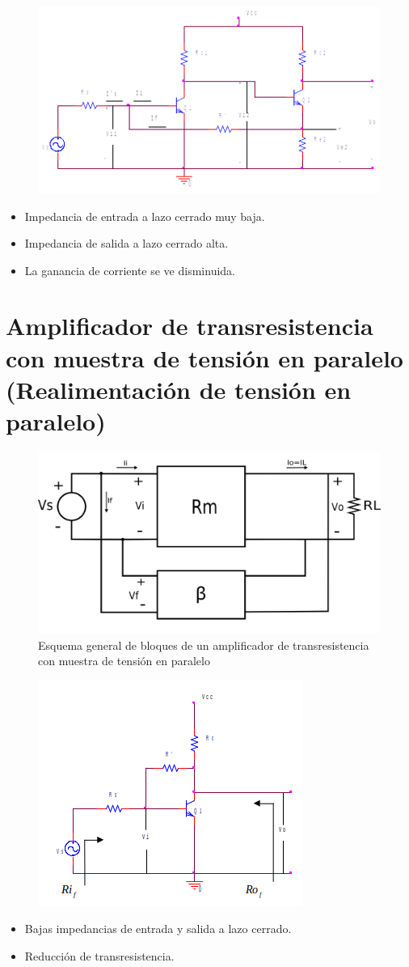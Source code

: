 \newpage

\begin{figure}[h]
	\includegraphics[width=0.8\linewidth]{./img/esq3.png}
	\centering
	\label{fig:esq_amp3}
\end{figure}

\begin{itemize}
	\item Impedancia de entrada a lazo cerrado muy baja.
	\item Impedancia de salida a lazo cerrado alta.
	\item La ganancia de corriente se ve disminuida.
\end{itemize}

\section{Amplificador de transresistencia con muestra de tensión en paralelo (Realimentación de tensión en paralelo)}

\begin{figure}[h]
	\includegraphics[width=0.8\linewidth]{./img/4.png}
	\centering
	\caption{Esquema general de bloques de un amplificador de transresistencia con muestra de tensión en paralelo}
	\label{fig:amp4}
\end{figure}
\newpage
\begin{figure}[h]
	\includegraphics[width=0.5\linewidth]{./img/esq4.png}
	\centering
	\label{fig:esq_amp4}
\end{figure}

\begin{itemize}
	\item Bajas impedancias de entrada y salida a lazo cerrado.
	\item Reducción de transresistencia.
\end{itemize}


